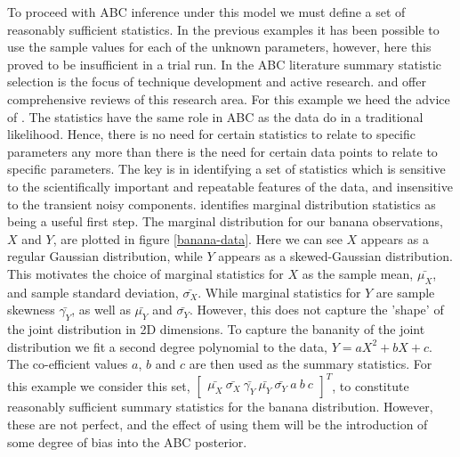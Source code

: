 To proceed with ABC inference under this model we must define a set of reasonably sufficient statistics. In the previous examples it has been possible to use the sample values for each of the unknown parameters, however, here this proved to be insufficient in a trial run. In the ABC literature summary statistic selection is the focus of technique development and active research. \citet{Blum2013} and \citet{Prangle2017} offer comprehensive reviews of this research area. For this example we heed the advice of \citet{Wood2010}. The statistics have the same role in ABC as the data do in a traditional likelihood. Hence, there is no need for certain statistics to relate to specific parameters any more than there is the need for certain data points to relate to specific parameters. The key is in identifying a set of statistics which is sensitive to the scientifically important and repeatable features of the data, and insensitive to the transient noisy components. \citet{Wood2010} identifies marginal distribution statistics as being a useful first step. The marginal distribution for our banana observations, $X$ and $Y$, are plotted in figure \ref{banana-data}. Here we can see $X$ appears as a regular Gaussian distribution, while $Y$ appears as a skewed-Gaussian distribution. This motivates the choice of marginal statistics for $X$ as the sample mean, $\bar{\mu_X}$, and sample standard deviation, $\bar{\sigma_X}$. While marginal statistics for $Y$ are sample skewness $\bar{\gamma_Y}$, as well as $\bar{\mu_Y}$ and $\bar{\sigma_Y}$. However, this does not capture the 'shape' of the joint distribution in 2D dimensions. To capture the bananity of the joint distribution we fit a second degree polynomial to the data, $Y = aX^2 + bX + c$. The co-efficient values $a$, $b$ and $c$ are then used as the summary statistics. For this example we consider this set, $\begin{bmatrix}
\bar{\mu_X}\ \bar{\sigma_X}\ \bar{\gamma_Y}\ \bar{\mu_Y}\ \bar{\sigma_Y}\ a\ b\ c
\end{bmatrix}^T$, to constitute reasonably sufficient summary statistics for the banana distribution. However, these are not perfect, and the effect of using them will be the introduction of some degree of bias into the ABC posterior. \par

